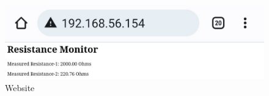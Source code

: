 \begin{figure}[!ht]
\centering
\includegraphics[width=\columnwidth]{vaman-esp32/i2c-resistance/figs/website.jpeg}
\caption{Website}
\label{fig:website_results}
\end{figure}
